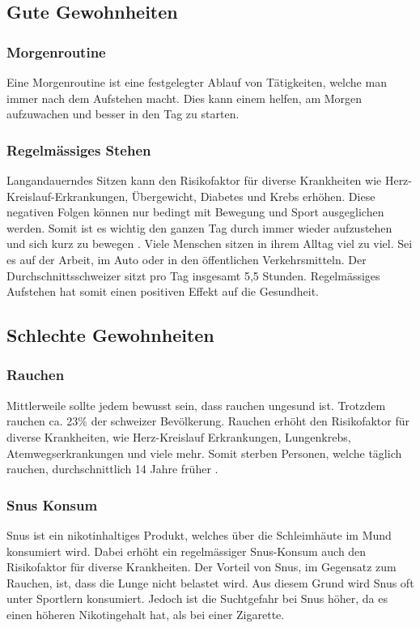 \subsection{Gute Gewohnheiten}
\subsubsection{Morgenroutine}
Eine Morgenroutine ist eine festgelegter Ablauf von Tätigkeiten, welche man immer nach dem Aufstehen macht.
\newline
Dies kann einem helfen, am Morgen aufzuwachen und besser in den Tag zu starten.
\subsubsection{Regelmässiges Stehen}
Langandauerndes Sitzen kann den Risikofaktor für diverse Krankheiten wie Herz- Kreislauf-Erkrankungen, Übergewicht, Diabetes und Krebs erhöhen. Diese negativen Folgen können nur bedingt mit Bewegung und Sport ausgeglichen werden. Somit ist es wichtig den ganzen Tag durch immer wieder aufzustehen und sich kurz zu bewegen \cite{bundesamtfrgesundheitbag_2020_aufstehen}.
\newline
Viele Menschen sitzen in ihrem Alltag viel zu viel. Sei es auf der Arbeit, im Auto oder in den öffentlichen Verkehrsmitteln. Der Durchschnittsschweizer sitzt pro Tag insgesamt 5,5 Stunden.
\newline
Regelmässiges Aufstehen hat somit einen positiven Effekt auf die Gesundheit.
\subsection{Schlechte Gewohnheiten}
\subsubsection{Rauchen}
Mittlerweile sollte jedem bewusst sein, dass rauchen ungesund ist. Trotzdem rauchen ca. 23\% der schweizer Bevölkerung.
\newline
Rauchen erhöht den Risikofaktor für diverse Krankheiten, wie Herz-Kreislauf Erkrankungen, Lungenkrebs, Atemwegserkrankungen und viele mehr. Somit sterben Personen, welche täglich rauchen, durchschnittlich 14 Jahre früher \cite{bundesamtfrgesundheitbag_2015_tabak}.
\subsubsection{Snus Konsum}
Snus ist ein nikotinhaltiges Produkt, welches über die Schleimhäute im Mund konsumiert wird. Dabei erhöht ein regelmässiger Snus-Konsum auch den Risikofaktor für diverse Krankheiten.
\newline
Der Vorteil von Snus, im Gegensatz zum Rauchen, ist, dass die Lunge nicht belastet wird. Aus diesem Grund wird Snus oft unter Sportlern konsumiert. Jedoch ist die Suchtgefahr bei Snus höher, da es einen höheren Nikotingehalt hat, als bei einer Zigarette.

